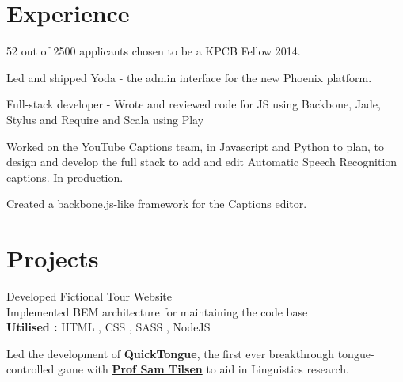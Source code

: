 \documentclass[]{deedy-resume-openfont}
\begin{document}
\begin{minipage}[t]{0.66\textwidth} 

\section{Experience}
\vspace{\topsep} %
\begin{tightemize}
\item 52 out of 2500 applicants chosen to be a KPCB Fellow 2014.
\item Led and shipped Yoda - the admin interface for the new Phoenix platform. 
\item Full-stack developer - Wrote and reviewed code for JS using Backbone, Jade, Stylus and Require and Scala using Play
\end{tightemize}
\sectionsep

\begin{tightemize}
\item Worked on the YouTube Captions team, in Javascript and Python to plan, to design and develop the full stack to add and edit Automatic Speech Recognition captions. In production.
\item Created a backbone.js-like framework for the Captions editor.
\end{tightemize}
\sectionsep



\section{Projects}
\textbullet{} Developed Fictional Tour Website  \\
\textbullet{} Implemented BEM architecture for maintaining the code base \\
\textbf{Utilised : } HTML , CSS , SASS , NodeJS
\sectionsep

Led the development of \textbf{QuickTongue}, the first ever breakthrough tongue-controlled game with \textbf{\href{http://conf.ling.cornell.edu/~tilsen/}{Prof Sam Tilsen}} to aid in Linguistics research. 
\sectionsep


\end{minipage}
\end{document}
